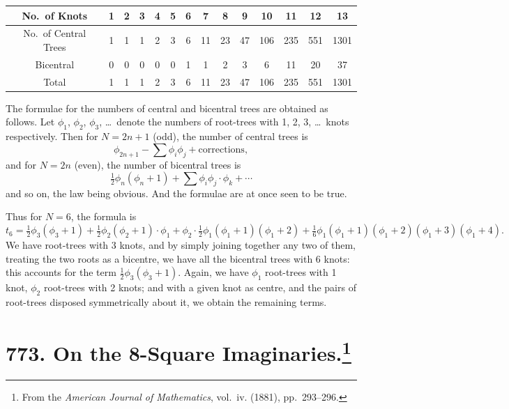 \documentclass[11pt,a4paper]{article}
\theoremstyle{definition}
\begin{document}
\begin{center}
\begin{tabular}{c|ccccccccccccc}
\toprule
No.\ of Knots & 1 & 2 & 3 & 4 & 5 & 6 & 7 & 8 & 9 & 10 & 11 & 12 & 13 \\
\midrule
No.\ of Central Trees & 1 & 1 & 1 & 2 & 3 & 6 & 11 & 23 & 47 & 106 & 235 & 551 & 1301 \\
\quad\; Bicentral & 0 & 0 & 0 & 0 & 0 & 1 & 1 & 2 & 3 & 6 & 11 & 20 & 37 \\
\midrule
Total & 1 & 1 & 1 & 2 & 3 & 6 & 11 & 23 & 47 & 106 & 235 & 551 & 1301 \\
\bottomrule
\end{tabular}
\end{center}

The formulae for the numbers of central and bicentral trees are obtained as follows. Let $\phi_1$, $\phi_2$, $\phi_3$, \dots\ denote the numbers of root-trees with 1, 2, 3, \dots\ knots respectively. Then for $N = 2n + 1$ (odd), the number of central trees is
\[
\phi_{2n+1} - \sum \phi_i\phi_j + \text{corrections},
\]
and for $N = 2n$ (even), the number of bicentral trees is
\[
\tfrac{1}{2}\phi_n(\phi_n + 1) + \sum \phi_i\phi_j \cdot \phi_k + \dotsb
\]
and so on, the law being obvious. And the formulae are at once seen to be true.

Thus for $N = 6$, the formula is
\[
t_6 = \tfrac{1}{2}\phi_3(\phi_3 + 1) + \tfrac{1}{2}\phi_2(\phi_2 + 1)\cdot\phi_1 + \phi_2 \cdot \tfrac{1}{2}\phi_1(\phi_1 + 1)(\phi_1 + 2) + \tfrac{1}{6}\phi_1(\phi_1 + 1)(\phi_1 + 2)(\phi_1 + 3)(\phi_1 + 4).
\]
We have root-trees with 3 knots, and by simply joining together any two of them, treating the two roots as a bicentre, we have all the bicentral trees with 6 knots: this accounts for the term $\tfrac{1}{2}\phi_3(\phi_3 + 1)$. Again, we have $\phi_1$ root-trees with 1 knot, $\phi_2$ root-trees with 2 knots; and with a given knot as centre, and the pairs of root-trees disposed symmetrically about it, we obtain the remaining terms.

\newpage
\section[On the 8-Square Imaginaries]{773. On the 8-Square Imaginaries.\footnote{From the \textit{American Journal of Mathematics}, vol.~iv. (1881), pp.~293--296.}}
\end{document}
